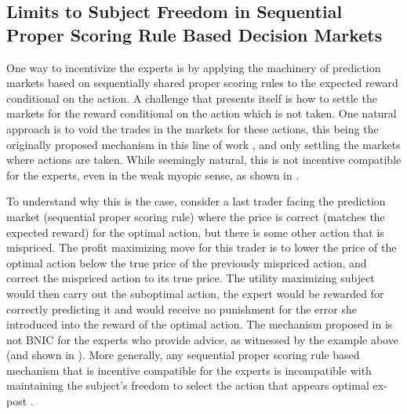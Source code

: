 \subsection{Limits to Subject Freedom in Sequential Proper Scoring Rule Based Decision Markets}

One way to incentivize the experts is by applying the machinery of prediction markets based on sequentially shared proper scoring rules to the expected reward conditional on the action.
A challenge that presents itself is how to settle the markets for the reward conditional on the action which is not taken.
One natural approach is to void the trades in the markets for these actions, this being the originally proposed mechanism in this line of work \citep{hanson2002decision}, and only settling the markets where actions are taken.
While seemingly natural, this is not incentive compatible for the experts, even in the weak myopic sense, as shown in \citep{othman2010decision}. 

To understand why this is the case, consider a last trader facing the prediction market (sequential proper scoring rule)  where the  price is correct (matches the expected reward) for the optimal action, but there is some other action that is mispriced. The profit maximizing move for this trader is to lower the price of the optimal action below the true price of the previously mispriced action, and correct the mispriced action to its true  price. 
The utility maximizing subject would then carry out the suboptimal action, the expert would be rewarded for correctly predicting it and would receive no punishment for the error she introduced into the reward of the optimal action. 
The mechanism proposed in \citep{hanson2002decision} is not BNIC for the experts who provide advice, as witnessed by the example above (and shown in \citep{othman2010decision,chen2014eliciting}).
More generally, any sequential proper scoring rule based mechanism that is incentive compatible for the experts is incompatible with maintaining the subject's freedom to select the action that appears optimal ex-post \citep{ chen2014eliciting}. 



